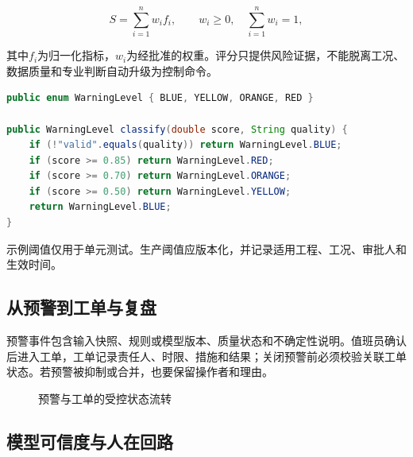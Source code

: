 \[
S=\sum_{i=1}^{n} w_i f_i,\qquad
w_i\ge 0,\quad \sum_{i=1}^{n}w_i=1,
\]

其中$f_i$为归一化指标，$w_i$为经批准的权重。评分只提供风险证据，不能脱离工况、数据质量和专业判断自动升级为控制命令。

\begin{lstlisting}[language=Java]
public enum WarningLevel { BLUE, YELLOW, ORANGE, RED }

public WarningLevel classify(double score, String quality) {
    if (!"valid".equals(quality)) return WarningLevel.BLUE;
    if (score >= 0.85) return WarningLevel.RED;
    if (score >= 0.70) return WarningLevel.ORANGE;
    if (score >= 0.50) return WarningLevel.YELLOW;
    return WarningLevel.BLUE;
}
\end{lstlisting}

示例阈值仅用于单元测试。生产阈值应版本化，并记录适用工程、工况、审批人和生效时间。

\subsection{从预警到工单与复盘}

预警事件包含输入快照、规则或模型版本、质量状态和不确定性说明。值班员确认后进入工单，工单记录责任人、时限、措施和结果；关闭预警前必须校验关联工单状态。若预警被抑制或合并，也要保留操作者和理由。

\begin{figure}[htbp]
\centering
{}
\caption{预警与工单的受控状态流转}
\label{fig:warning-workorder-flow}
\end{figure}

\subsection{模型可信度与人在回路}

